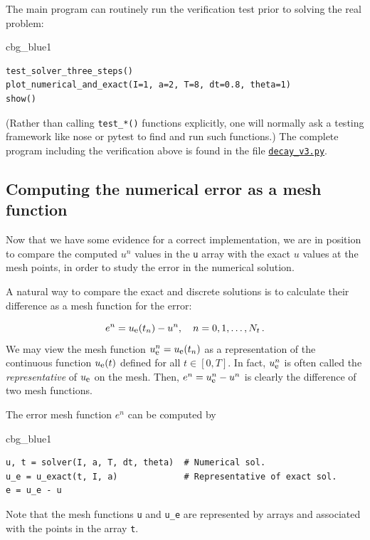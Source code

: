 \documentclass[%
oneside,                 %
final,                   %
10pt]{article}
\newenvironment{_cod_tight}[1]{
   \def\FrameCommand{\colorbox{#1}}
   \FrameRule0.6pt\MakeFramed {\FrameRestore}\vskip3mm}
   {\vskip0mm\endMakeFramed}
\newenvironment{cod}[1]{
\bgroup\rmfamily
\fboxsep=0mm\relax
\begin{_cod_tight}{#1}
\list{}{\parsep=-2mm\parskip=0mm\topsep=0pt\leftmargin=2mm
\rightmargin=2\leftmargin\leftmargin=4pt\relax}
\item\relax}
{\endlist\end{_cod_tight}\egroup}
\begin{document}
\noindent
The main program can routinely run the verification test prior to
solving the real problem:

\begin{cod}{cbg_blue1}\begin{Verbatim}[numbers=none,fontsize=\fontsize{9pt}{9pt},baselinestretch=0.95,xleftmargin=2mm]
test_solver_three_steps()
plot_numerical_and_exact(I=1, a=2, T=8, dt=0.8, theta=1)
show()
\end{Verbatim}
\end{cod}
\noindent
(Rather than calling \Verb!test_*()! functions explicitly, one will
normally ask a testing framework like nose
or pytest to find and run such functions.)
The complete program including the verification above is
found in the file \href{{http://tinyurl.com/ofkw6kc/alg/decay_v3.py}}{\nolinkurl{decay_v3.py}}.


\subsection{Computing the numerical error as a mesh function}
\label{decay:computing:error}

Now that we have some evidence for a correct implementation, we are in
position to compare the computed $u^n$ values in the \texttt{u} array with
the exact $u$ values at the mesh points, in order to study the error
in the numerical solution.


A natural way to compare the exact and discrete solutions is to
calculate their difference as a mesh function for the error:

\begin{equation}
e^n = \uex(t_n) - u^n,\quad n=0,1,\ldots,N_t \tp
\end{equation}
We may view the mesh function
$\uex^n = \uex(t_n)$ as a representation of the continuous function $\uex(t)$
defined for all $t\in [0,T]$. In fact,
$\uex^n$ is often called the \emph{representative} of
$\uex$ on the mesh. Then, $e^n = \uex^n - u^n$ is clearly
the difference of two mesh functions.

The error mesh function $e^n$ can be computed by

\begin{cod}{cbg_blue1}\begin{Verbatim}[numbers=none,fontsize=\fontsize{9pt}{9pt},baselinestretch=0.95,xleftmargin=2mm]
u, t = solver(I, a, T, dt, theta)  # Numerical sol.
u_e = u_exact(t, I, a)             # Representative of exact sol.
e = u_e - u
\end{Verbatim}
\end{cod}
\noindent
Note that the mesh functions \texttt{u} and \Verb!u_e! are represented by arrays
and associated with the points in the array \texttt{t}.
\end{document}
